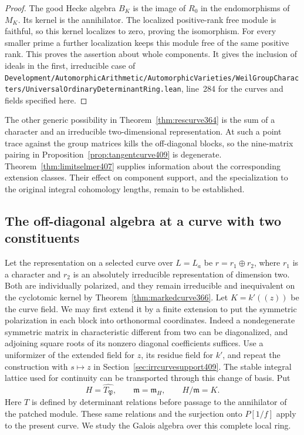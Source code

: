 \documentclass[a4paper,11pt]{article}
\theoremstyle{definition}
\theoremstyle{remark}
\newcommand{\srcloc}[2]{{\small\nolinkurl{#1.lean}}, line~#2}
\numberwithin{equation}{section}
\begin{document}
\begin{proof}
The good Hecke algebra \(B_K\) is the image of \(R_0\) in
the endomorphisms of \(M_K\). Its kernel is the annihilator.
The localized positive-rank free module is faithful, so
this kernel localizes to zero, proving the isomorphism.
For every smaller prime a further localization keeps this
module free of the same positive rank. This proves the
assertion about whole components. It gives the inclusion
of ideals in the first, irreducible case of
\srcloc{Development/AutomorphicArithmetic/AutomorphicVarieties/WeilGroupCharacters/UniversalOrdinaryDeterminantRing}{284}
for the curves and fields specified here.
\end{proof}

The other generic possibility in Theorem~\ref{thm:rescurve364}
is the sum of a character and an irreducible two-dimensional
representation. At such a point trace against the group
matrices kills the off-diagonal blocks, so the nine-matrix
pairing in Proposition~\ref{prop:tangentcurve409} is
degenerate. Theorem~\ref{thm:limitselmer407} supplies
information about the corresponding extension classes.
Their effect on component support, and the specialization
to the original integral cohomology lengths, remain to be
established.


\subsection{The off-diagonal algebra at a curve with two constituents}
\label{sec:oddblock410}

Let the representation on a selected curve over \(L=L_a\) be
\(r=r_1\oplus r_2\), where \(r_1\) is a character and \(r_2\)
is an absolutely irreducible representation of dimension two.
Both are individually polarized, and they remain irreducible
and inequivalent on the cyclotomic kernel by
Theorem~\ref{thm:markedcurve366}. Let \(K=k'((z))\) be the
curve field. We may first extend it by a finite extension
to put the symmetric polarization in each block into
orthonormal coordinates. Indeed a nondegenerate symmetric
matrix in characteristic different from two can be diagonalized,
and adjoining square roots of its nonzero diagonal coefficients
suffices. Use a uniformizer of the extended field for \(z\),
its residue field for \(k'\), and repeat the construction
with \(s\mapsto z\) in Section~\ref{sec:irrcurvesupport409}.
The stable integral lattice used for continuity can be transported
through this change of basis. Put
\[
            H=\widehat{T_{\mathfrak P}},\qquad
            \mathfrak m=\mathfrak m_H,\qquad H/\mathfrak m=K .
\]
Here \(T\) is defined by determinant relations before passage
to the annihilator of the patched module. These same relations
and the surjection onto \(P[1/f]\) apply to the present curve.
We study the Galois algebra over this complete local ring.
\end{document}
